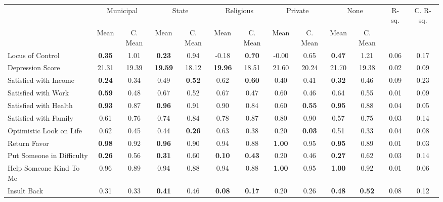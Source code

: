 \begin{tabular}{l c c c c c c c c c c c c}
\toprule
& \multicolumn{2}{c}{Municipal} & \multicolumn{2}{c}{State} & \multicolumn{2}{c}{Religious} & \multicolumn{2}{c}{Private} & \multicolumn{2}{c}{None} & R-sq. & C. R-sq. \\
& \scriptsize Mean & \scriptsize C. Mean & \scriptsize Mean & \scriptsize C. Mean & \scriptsize Mean & \scriptsize C. Mean & \scriptsize Mean & \scriptsize C. Mean & \scriptsize Mean & \scriptsize C. Mean & & \\
\midrule
Locus of Control & \textbf{     0.35} & 1.01 & \textbf{     0.23} & 0.94 &     -0.18 & \textbf{     0.70} &     -0.00 & 0.65 & \textbf{     0.47} & 1.21 &      0.06 &      0.17 \\
Depression Score &     21.31 & 19.39 & \textbf{    19.59} & 18.12 & \textbf{    19.96} & 18.51 &     21.60 & 20.24 &     21.70 & 19.38 &      0.02 &      0.09 \\
Satisfied with Income & \textbf{     0.24} & 0.34 &      0.49 & \textbf{     0.52} &      0.62 & \textbf{     0.60} &      0.40 & 0.41 & \textbf{     0.32} & 0.46 &      0.09 &      0.23 \\
Satisfied with Work & \textbf{     0.59} & 0.48 &      0.67 & 0.52 &      0.67 & 0.47 &      0.60 & 0.46 &      0.64 & 0.55 &      0.01 &      0.09 \\
Satisfied with Health & \textbf{     0.93} & 0.87 & \textbf{     0.96} & 0.91 &      0.90 & 0.84 &      0.60 & \textbf{     0.55} & \textbf{     0.95} & 0.88 &      0.04 &      0.05 \\
Satisfied with Family &      0.61 & 0.76 &      0.74 & 0.84 &      0.78 & 0.87 &      0.80 & 0.90 &      0.57 & 0.75 &      0.03 &      0.14 \\
Optimistic Look on Life &      0.62 & 0.45 &      0.44 & \textbf{     0.26} &      0.63 & 0.38 &      0.20 & \textbf{     0.03} &      0.51 & 0.33 &      0.04 &      0.08 \\
Return Favor & \textbf{     0.98} & 0.92 & \textbf{     0.96} & 0.90 &      0.94 & 0.88 & \textbf{     1.00} & 0.95 & \textbf{     0.95} & 0.89 &      0.01 &      0.03 \\
Put Someone in Difficulty & \textbf{     0.26} & 0.56 & \textbf{     0.31} & 0.60 & \textbf{     0.10} & \textbf{     0.43} &      0.20 & 0.46 & \textbf{     0.27} & 0.62 &      0.03 &      0.14 \\
Help Someone Kind To Me &      0.96 & 0.89 &      0.94 & 0.88 &      0.94 & 0.88 & \textbf{     1.00} & 0.95 & \textbf{     1.00} & 0.92 &      0.01 &      0.06 \\
Insult Back &      0.31 & 0.33 & \textbf{     0.41} & 0.46 & \textbf{     0.08} & \textbf{     0.17} &      0.20 & 0.26 & \textbf{     0.48} & \textbf{     0.52} &      0.08 &      0.12 \\
\bottomrule
\end{tabular}
